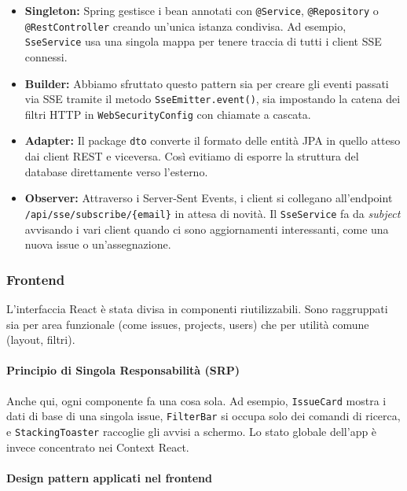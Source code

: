 \begin{itemize}
    \item \textbf{Singleton:} Spring gestisce i bean annotati con \texttt{@Service}, \texttt{@Repository} o \texttt{@RestController} creando un'unica istanza condivisa. Ad esempio, \texttt{SseService} usa una singola mappa per tenere traccia di tutti i client SSE connessi.

    \item \textbf{Builder:} Abbiamo sfruttato questo pattern sia per creare gli eventi passati via SSE tramite il metodo \texttt{SseEmitter.event()}, sia impostando la catena dei filtri HTTP in \texttt{WebSecurityConfig} con chiamate a cascata.

    \item \textbf{Adapter:} Il package \texttt{dto} converte il formato delle entità JPA in quello atteso dai client REST e viceversa. Così evitiamo di esporre la struttura del database direttamente verso l'esterno.

    \item \textbf{Observer:} Attraverso i Server-Sent Events, i client si collegano all'endpoint \texttt{/api/sse/subscribe/\{email\}} in attesa di novità. Il \texttt{SseService} fa da \textit{subject} avvisando i vari client quando ci sono aggiornamenti interessanti, come una nuova issue o un'assegnazione.
\end{itemize}

\subsubsection{Frontend}

L'interfaccia React è stata divisa in componenti riutilizzabili. Sono raggruppati sia per area funzionale (come issues, projects, users) che per utilità comune (layout, filtri).

\paragraph{Principio di Singola Responsabilità (SRP)}
Anche qui, ogni componente fa una cosa sola. Ad esempio, \texttt{IssueCard} mostra i dati di base di una singola issue, \texttt{FilterBar} si occupa solo dei comandi di ricerca, e \texttt{StackingToaster} raccoglie gli avvisi a schermo. Lo stato globale dell'app è invece concentrato nei Context React.

\paragraph{Design pattern applicati nel frontend}

